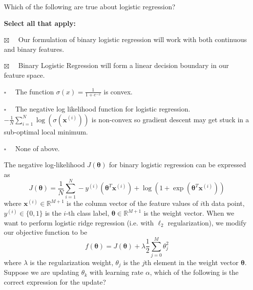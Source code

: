 \documentclass[11pt,addpoints,answers]{exam}
\newcommand{\emptysquare}{{\LARGE $\square$}\ \ }
\newcommand{\filledsquare}{{\LARGE $\boxtimes$}\ \ }
\newcommand{\xv}{\mathbf{x}}
\newcommand{\thetav     }{\boldsymbol \theta     }
\begin{document}
\begin{questions}
        \question[2] Which of the following are true about logistic regression?
    
    \textbf{Select all that apply:}
    \begin{list}{}
        \item 
            \filledsquare
            Our formulation of binary logistic regression will work with both continuous and binary features.
        \item 
            \filledsquare
            Binary Logistic Regression will form a linear decision boundary in our feature space.
        \item 
            \emptysquare
            The function $\sigma(x) = \frac{1}{1+e^{-x}}$ is convex.
        \item 
            \emptysquare
            The negative log likelihood function for logistic regression. $- \frac1N\sum_{i = 1}^N \log(\sigma(\xv^{(i)}))$ is non-convex so gradient descent may get stuck in a sub-optimal local minimum.
        \item 
            \emptysquare
            None of above.
    \end{list}
    
    
    
    \question[1] The negative log-likelihood $J(\thetav)$ for binary logistic regression can be expressed as 
    $$J(\thetav) = \frac{1}{N}\sum_{i=1}^N  -y^{(i)}\left(\thetav^T\xv^{\left(i\right)}\right)+\log\left(1+\exp(\thetav^T\xv^{\left(i\right)})\right)$$
    where $\xv^{(i)}\in \mathbb{R}^{M+1}$ is the column vector of the feature values of $i$th data point, $y^{(i)}\in\{0, 1\}$ is the $i$-th class label, $\thetav\in\mathbb{R}^{M+1}$ is the weight vector. When we want to perform logistic ridge regression (i.e. with $\ell_2$ regularization), we modify our objective function to be 
    $$ f(\thetav) = J(\thetav) + \lambda \frac{1}{2}\sum_{j=0}^M \theta_j^2$$
    where $\lambda$ is the regularization weight, $\theta_j$ is the $j$th element in the weight vector $\thetav$. Suppose we are updating $\theta_k$ with learning rate $\alpha$, which of the following is the correct expression for the update?
    

\end{questions}
\end{document}

